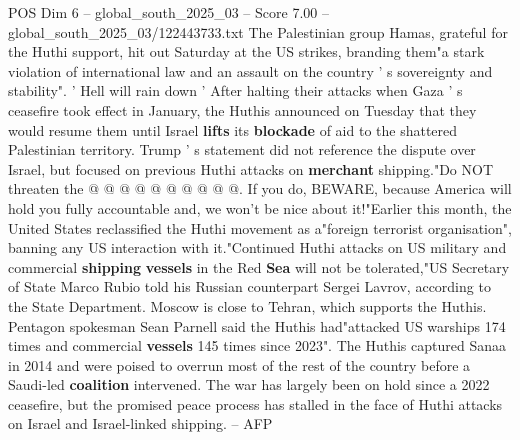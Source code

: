 \begin{textsample}{POS Dim 6 – global\_south\_2025\_03 – Score 7.00 – global\_south\_2025\_03/122443733.txt}
The Palestinian group Hamas, grateful for the Huthi support, hit out Saturday at the US strikes, branding them"a stark violation of international law and an assault on the country ' s sovereignty and stability". ' Hell will rain down ' After halting their attacks when Gaza ' s ceasefire took effect in January, the Huthis announced on Tuesday that they would resume them until Israel \textbf{lifts} its \textbf{blockade} of aid to the shattered Palestinian territory.
Trump ' s statement did not reference the dispute over Israel, but focused on previous Huthi attacks on \textbf{merchant} shipping."Do NOT threaten the @ @ @ @ @ @ @ @ @ @.
If you do, BEWARE, because America will hold you fully accountable and, we won't be nice about it!"Earlier this month, the United States reclassified the Huthi movement as a"foreign terrorist organisation", banning any US interaction with it."Continued Huthi attacks on US military and commercial \textbf{shipping} \textbf{vessels} in the Red \textbf{Sea} will not be tolerated,"US Secretary of State Marco Rubio told his Russian counterpart Sergei Lavrov, according to the State Department.
Moscow is close to Tehran, which supports the Huthis.
Pentagon spokesman Sean Parnell said the Huthis had"attacked US warships 174 times and commercial \textbf{vessels} 145 times since 2023".
The Huthis captured Sanaa in 2014 and were poised to overrun most of the rest of the country before a Saudi-led \textbf{coalition} intervened.
The war has largely been on hold since a 2022 ceasefire, but the promised peace process has stalled in the face of Huthi attacks on Israel and Israel-linked shipping. -- AFP

\end{textsample}
